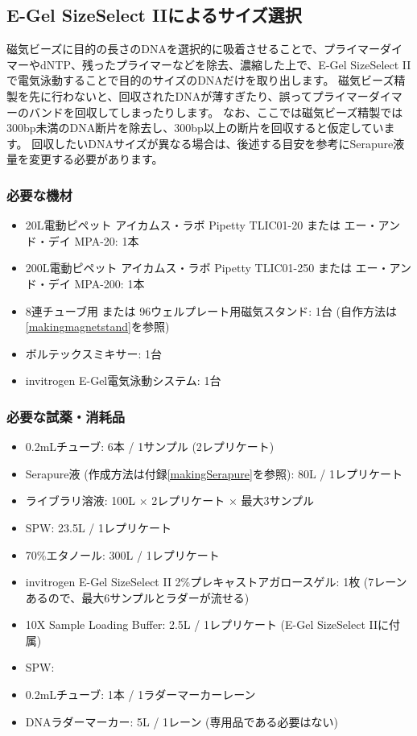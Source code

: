 \documentclass[titlepage,10pt,a4paper,uplatex]{jsbook}
\begin{document}
\subsection{E-Gel SizeSelect IIによるサイズ選択}

磁気ビーズに目的の長さのDNAを選択的に吸着させることで、プライマーダイマーやdNTP、残ったプライマーなどを除去、濃縮した上で、E-Gel SizeSelect IIで電気泳動することで目的のサイズのDNAだけを取り出します。
磁気ビーズ精製を先に行わないと、回収されたDNAが薄すぎたり、誤ってプライマーダイマーのバンドを回収してしまったりします。
なお、ここでは磁気ビーズ精製では300bp未満のDNA断片を除去し、300bp以上の断片を回収すると仮定しています。
回収したいDNAサイズが異なる場合は、後述する目安を参考にSerapure液量を変更する必要があります。

\subsubsection{必要な機材}
\begin{itemize}
\item 20{\textmu}L電動ピペット アイカムス・ラボ Pipetty TLIC01-20 または エー・アンド・デイ MPA-20: 1本
\item 200{\textmu}L電動ピペット アイカムス・ラボ Pipetty TLIC01-250 または エー・アンド・デイ MPA-200: 1本
\item 8連チューブ用 または 96ウェルプレート用磁気スタンド: 1台 (自作方法は\ref{makingmagnetstand}を参照)
\item ボルテックスミキサー: 1台
\item invitrogen E-Gel電気泳動システム: 1台
\end{itemize}

\subsubsection{必要な試薬・消耗品}
\begin{itemize}
\item 0.2mLチューブ: 6本 / 1サンプル (2レプリケート)
\item Serapure液 (作成方法は付録\ref{makingSerapure}を参照): 80{\textmu}L / 1レプリケート
\item ライブラリ溶液: 100{\textmu}L × 2レプリケート × 最大3サンプル
\item SPW: 23.5{\textmu}L / 1レプリケート
\item 70\%エタノール: 300{\textmu}L / 1レプリケート
\item invitrogen E-Gel SizeSelect II 2\%プレキャストアガロースゲル: 1枚 (7レーンあるので、最大6サンプルとラダーが流せる)
\item 10X Sample Loading Buffer: 2.5{\textmu}L / 1レプリケート (E-Gel SizeSelect IIに付属)
\item SPW: 
\item 0.2mLチューブ: 1本 / 1ラダーマーカーレーン
\item DNAラダーマーカー: 5{\textmu}L / 1レーン (専用品である必要はない)
\end{itemize}
\end{document}

